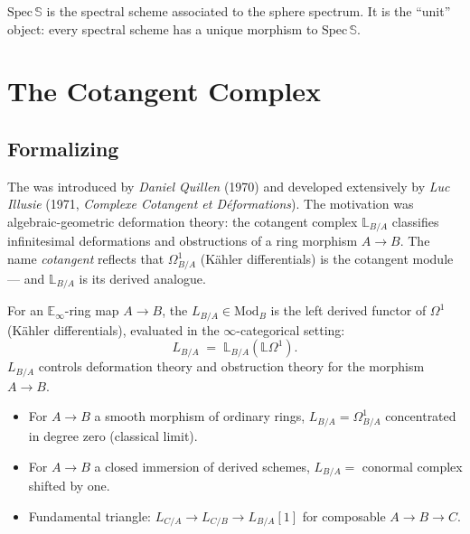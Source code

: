 \begin{example_thm}
\label{ex:spec-sphere}
$\mathrm{Spec}\,\mathbb{S}$ is the spectral scheme associated to the
sphere spectrum. It is the ``unit'' object: every spectral scheme has a
unique morphism to $\mathrm{Spec}\,\mathbb{S}$.
\end{example_thm}


\section{The Cotangent Complex}
\label{sec:cotangent}

\subsection{Formalizing}

\begin{nameorigin}
The  was introduced by \emph{Daniel Quillen}
(1970) and developed extensively by \emph{Luc Illusie} (1971,
\emph{Complexe Cotangent et Déformations}). The motivation was
algebraic-geometric deformation theory: the cotangent complex
$\mathbb{L}_{B/A}$ classifies infinitesimal deformations and obstructions
of a ring morphism $A \to B$. The name \emph{cotangent} reflects that
$\Omega^1_{B/A}$ (Kähler differentials) is the cotangent module — and
$\mathbb{L}_{B/A}$ is its derived analogue.
\end{nameorigin}

\begin{definition}
\label{def:cotangent}
For an $\mathbb{E}_\infty$-ring map $A \to B$, the 
$L_{B/A} \in \mathrm{Mod}_B$ is the left derived functor of $\Omega^1$
(Kähler differentials), evaluated in the $\infty$-categorical setting:
\begin{equation*}
  L_{B/A} \;=\; \mathbb{L}_{B/A}(\mathbb{L} \Omega^1).
\end{equation*}
$L_{B/A}$ controls deformation theory and obstruction theory for the
morphism $A \to B$.
\end{definition}

\begin{theorem}
\label{thm:cotangent-properties}
\begin{itemize}
  \item For $A \to B$ a smooth morphism of ordinary rings, $L_{B/A} =
        \Omega^1_{B/A}$ concentrated in degree zero (classical limit).
  \item For $A \to B$ a closed immersion of derived schemes,
        $L_{B/A} = $ conormal complex shifted by one.
  \item Fundamental triangle: $L_{C/A} \to L_{C/B} \to L_{B/A}[1]$ for
        composable $A \to B \to C$.
\end{itemize}
\end{theorem}

